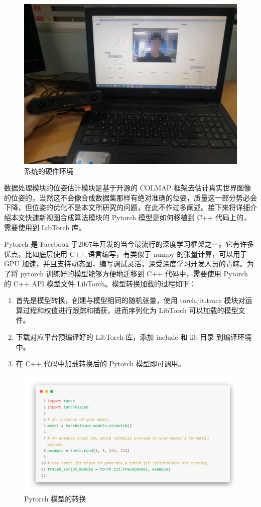 \begin{figure}[htbp]
    \centering
    \includegraphics[width=0.95\linewidth]{figures/system-hardware.jpg}
    \caption{系统的硬件环境}
    \label{fig:photo}
\end{figure}
数据处理模块的位姿估计模块是基于开源的 COLMAP 框架去估计真实世界图像的位姿的，当然这不会像合成数据集那样有绝对准确的位姿，质量这一部分势必会下降，但位姿的优化不是本文所研究的问题，在此不作过多阐述。接下来将详细介绍本文快速新视图合成算法模块的 Pytorch 模型是如何移植到 C++ 代码上的，需要使用到 LibTorch 库。

Pytorch 是 Facebook 于2007年开发的当今最流行的深度学习框架之一。它有许多优点，比如底层使用 C++ 语言编写，有类似于 numpy 的张量计算，可以用于 GPU 加速，并且支持动态图，编写调试灵活，深受深度学习开发人员的青睐。为了将 pytorch 训练好的模型能够方便地迁移到 C++ 代码中，需要使用 Pytorch 的 C++ API 模型文件 LibTorch。模型转换加载的过程如下： 

\begin{enumerate}
    \item 首先是模型转换，创建与模型相同的随机张量，使用 torch.jit.trace 模块对运算过程和权值进行跟踪和捕获，进而序列化为 LibTorch 可以加载的模型文件。
    \item 下载对应平台预编译好的 LibTorch 库，添加 include 和 lib 目录
到编译环境中。
    \item 在 C++ 代码中加载转换后的 Pytorch 模型即可调用。 
\end{enumerate}

\begin{figure}[htbp]
    \centering
    \includegraphics[width=0.6\linewidth]{figures/code-pytorch.png}
    \caption{Pytorch 模型的转换}
    \label{fig:code_pytorch}
\end{figure}

